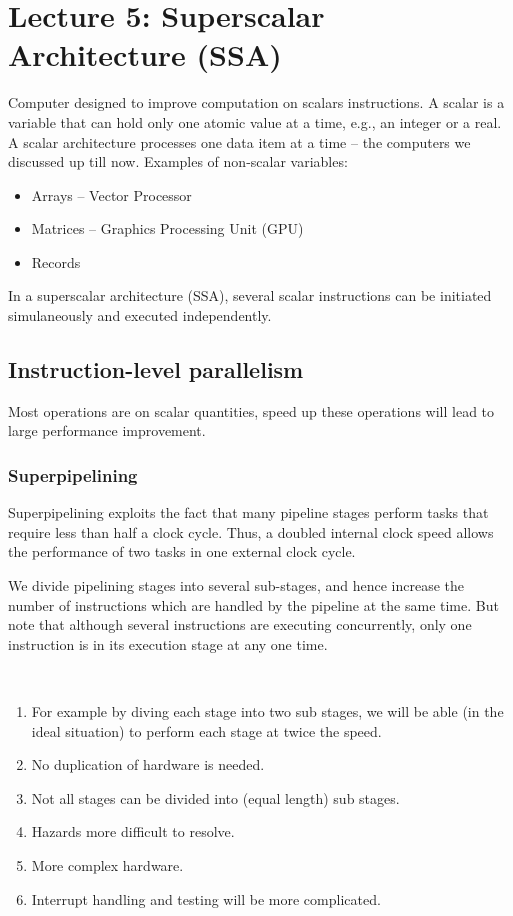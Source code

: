 \section{Lecture 5: Superscalar Architecture (SSA)}
Computer designed to improve computation on scalars instructions.
A scalar is a variable that can hold only one atomic value at a time, e.g., an integer or a real.
A scalar architecture processes one data item at a time -- the computers we discussed up till now.
Examples of non-scalar variables:
\begin{itemize}
\item Arrays -- Vector Processor
\item Matrices -- Graphics Processing Unit (GPU)
\item Records
\end{itemize}

In a superscalar architecture (SSA), several scalar instructions can be initiated simulaneously and executed independently.

\subsection{Instruction-level parallelism}
Most operations are on scalar quantities, speed up these operations will lead to large performance improvement.

\subsubsection{Superpipelining}
Superpipelining exploits the fact that many pipeline stages perform tasks that require less than half a clock cycle. Thus, a doubled internal clock speed allows the performance of two tasks in one external clock cycle.

We divide pipelining stages into several sub-stages, and hence increase the number of instructions which are handled by the pipeline at the same time. But note that although several instructions are executing concurrently, only one instruction is in its execution stage at any one time.

 \\

\begin{enumerate}
\item For example by diving each stage into two sub stages, we will be able (in the ideal situation) to perform each stage at twice the speed.
\item No duplication of hardware is needed. 
\item Not all stages can be divided into (equal length) sub stages.
\item Hazards more difficult to resolve.
\item More complex hardware.
\item Interrupt handling and testing will be more complicated.
\end{enumerate}
  
